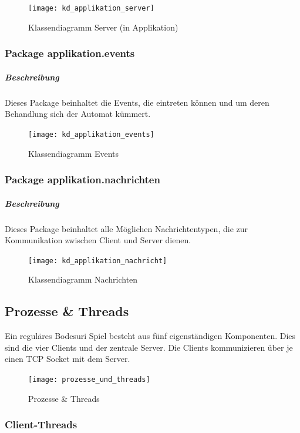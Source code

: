\documentclass[12pt,halfparskip]{scrartcl}
\begin{document}

\begin{figure}[h]
	\centering
	\texttt{[image: kd\_applikation\_server]}
	\caption{Klassendiagramm Server (in Applikation)}
	\label{fig:kd_applikation_server}
\end{figure}

\clearpage
\subsubsection{Package applikation.events}
\label{ssub:package_applikation_events}
\subparagraph{Beschreibung}
\label{ssub:beschreibung}
Dieses Package beinhaltet die Events, die eintreten können und um deren Behandlung sich der Automat kümmert.
\begin{figure}[h]
	\centering
	\texttt{[image: kd\_applikation\_events]}
	\caption{Klassendiagramm Events}
	\label{fig:kd_applikation_events}
\end{figure}

\subsubsection{Package applikation.nachrichten}
\label{ssub:package_applikation_nachrichten}
\subparagraph{Beschreibung}
\label{ssub:beschreibung}
Dieses Package beinhaltet alle Möglichen Nachrichtentypen, die zur Kommunikation zwischen Client und Server dienen.
\begin{figure}[h]
	\centering
	\texttt{[image: kd\_applikation\_nachricht]}
	\caption{Klassendiagramm Nachrichten}
	\label{fig:kd_applikation_nachricht}
\end{figure}
\clearpage

\subsection{Prozesse \& Threads} %
\label{sub:prozesse_threads}

Ein reguläres Bodesuri Spiel besteht aus fünf eigenständigen Komponenten. Dies sind die vier Clients und der zentrale Server. Die Clients kommunizieren über je einen TCP Socket mit dem Server.

\begin{figure}[h]
	\centering
	\texttt{[image: prozesse\_und\_threads]}
	\caption{Prozesse \& Threads}
	\label{fig:prozesse_und_threads}
\end{figure}

\clearpage
\subsubsection{Client-Threads} %
\label{ssub:client_threads}
\end{document}
